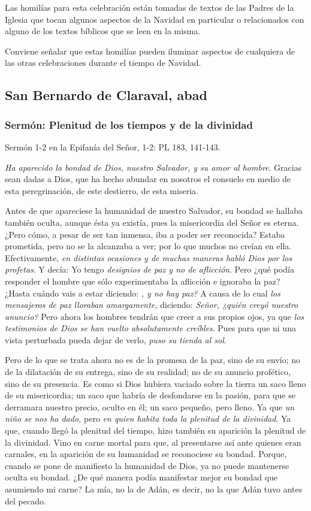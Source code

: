 Las homilías para esta celebración están tomadas de textos de las Padres de la Iglesia que tocan algunos aspectos de la Navidad en particular o relacionados con alguno de los textos bíblicos que se leen en la misma.

Conviene señalar que estas homilías pueden iluminar aspectos de cualquiera de las otras celebraciones durante el tiempo de Navidad.

\subsection{San Bernardo de Claraval, abad}

\subsubsection{Sermón: Plenitud de los tiempos y de la divinidad}

Sermón 1-2 en la Epifanía del Señor, 1-2: PL 183, 141-143.

\emph{Ha aparecido la bondad de Dios, nuestro Salvador, y su amor al hombre}. Gracias sean dadas a Dios, que ha hecho abundar en nosotros el consuelo en medio de esta peregrinación, de este destierro, de esta miseria.

Antes de que apareciese la humanidad de nuestro Salvador, su bondad se hallaba también oculta, aunque ésta ya existía, pues la misericordia del Señor es eterna. ¿Pero cómo, a pesar de ser tan inmensa, iba a poder ser reconocida? Estaba prometida, pero no se la alcanzaba a ver; por lo que muchos no creían en ella. Efectivamente, \emph{en distintas ocasiones y de muchas maneras habló Dios por los profetas}. Y decía: Yo tengo \emph{designios de paz y no de aflicción}. Pero ¿qué podía responder el hombre que sólo experimentaba la aflicción e ignoraba la paz? ¿Hasta cuándo vais a estar diciendo: \emph{, y no hay paz?} A causa de lo cual \emph{los mensajeros de paz lloraban amargamente,} diciendo: \emph{Señor, ¿quién creyó nuestro anuncio?} Pero ahora los hombres tendrán que creer a sus propios ojos, ya que \emph{los testimonios de Dios se han vuelto absolutamente creíbles}. Pues para que ni una vista perturbada pueda dejar de verlo, \emph{puso su tienda al sol}.

Pero de lo que se trata ahora no es de la promesa de la paz, sino de su envío; no de la dilatación de su entrega, sino de su realidad; no de su anuncio profético, sino de su presencia. Es como si Dios hubiera vaciado sobre la tierra un saco lleno de su misericordia; un saco que habría de desfondarse en la pasión, para que se derramara nuestro precio, oculto en él; un saco pequeño, pero lleno. Ya que \emph{un niño se nos ha dado,} pero \emph{en quien habita toda la plenitud de la divinidad}. Ya que, cuando llegó la plenitud del tiempo, hizo también su aparición la plenitud de la divinidad. Vino en carne mortal para que, al presentarse así ante quienes eran carnales, en la aparición de su humanidad se reconociese su bondad. Porque, cuando se pone de manifiesto la humanidad de Dios, ya no puede mantenerse oculta su bondad. ¿De qué manera podía manifestar mejor su bondad que asumiendo mi carne? La mía, no la de Adán, es decir, no la que Adán tuvo antes del pecado.

